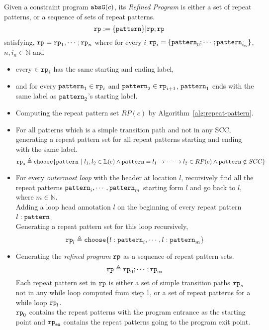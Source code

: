 \begin{defn}
  Given a constraint program $\mathtt{abs}{\mathtt{G}}(c)$,
  its \emph{Refined Program} is either a set of repeat patterns, or a sequence of sets of  repeat patterns.
  $$
  \mathtt{rp} := \{\mathtt{pattern}\} | \mathtt{rp}; \mathtt{rp}
  $$ 
  satisfying, $\mathtt{rp} = \mathtt{rp}_1, \cdots; \mathtt{rp}_n$ where for every $i$
  $\mathtt{rp}_i = \{\mathtt{pattern}_{0}; \cdots; \mathtt{pattern}_{i_n}\}$, $n, i_n \in \mathbb{N}$ and
  \begin{itemize}
  \item every $ \in \mathtt{rp}_i$ has the same starting and ending label,
  \item
  and for every $\mathtt{pattern}_1 \in \mathtt{rp}_i$ and $\mathtt{pattern}_2 \in \mathtt{rp}_{i + 1}$,
  $\mathtt{pattern}_1$ ends with the same label as $\mathtt{pattern}_2$'s starting label.
  \end{itemize}
\end{defn}
%
\begin{itemize}
\item Computing the repeat pattern set $RP(c)$ by Algorithm~\ref{alg:repeat-pattern}.
% 
\item For all patterns which is a simple transition path and not in any SCC,
generating a repeat pattern set for all
repeat patterns starting and ending with the same label.
\[
  \rprog_{s} \triangleq 
  \rpchoose{
  \rpattern ~|~ l_1, l_2 \in \lvar(c) \land 
  \rpattern = l_1 \to \cdots \to l_2 \in RP(c) 
  \land  \rpattern \notin SCC
    }
\]
%
\item 
For every \emph{outermost loop} with the header at location $l$,
recursively 
find all the repeat patterns $\mathtt{pattern}_{i}, \cdots, \mathtt{pattern}_{m}$ starting form $l$ and go back to $l$, where $m \in \mathbb{N}$.
\\
Adding a loop head annotation $l$ on the beginning of every repeat pattern $l: \mathtt{pattern}$.
\\
Generating a repeat pattern set for this loop recursively,
\[
  \rprog_l \triangleq 
  \rpchoose{
   l: \rpattern_{i}, \cdots, l: \rpattern_{m}
  }
\]
\item
Generating the \emph{refined program} $\mathtt{rp}$ as a sequence of repeat pattern sets.
%
\[
\mathtt{rp} \triangleq \mathtt{rp}_0; \cdots; \mathtt{rp}_{\mathtt{ex}}
\]
%
Each repeat pattern set in $\mathtt{rp}$ is either a set of simple transition paths $\mathtt{rp}_{s}$ not in any while loop computed from step 1,
or a set of repeat patterns for a while loop $\mathtt{rp}_l$.
\\
$\mathtt{rp}_0$ contains the repeat patterns with the program entrance as the starting point
and $\mathtt{rp}_{\mathtt{ex}}$ contains the repeat patterns going to the program exit point.
%
\end{itemize}
%


